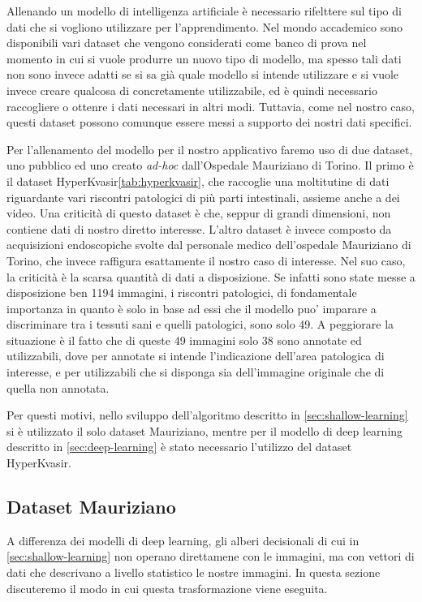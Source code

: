 Allenando un modello di intelligenza artificiale è necessario
rifelttere sul tipo di dati che si vogliono utilizzare per
l'apprendimento.
Nel mondo accademico sono disponibili vari dataset che vengono
considerati come banco di prova nel momento in cui si vuole
produrre un nuovo tipo di modello, ma spesso tali dati non 
sono invece adatti se si sa già quale modello si intende
utilizzare e si vuole invece creare qualcosa di concretamente
utilizzabile, ed è quindi necessario raccogliere o ottenre
i dati necessari in altri modi.
Tuttavia, come nel nostro caso, questi dataset possono comunque
essere messi a supporto dei nostri dati specifici.

Per l'allenamento del modello per il nostro applicativo faremo
uso di due dataset, uno pubblico ed uno creato {\it ad-hoc}
dall'Ospedale Mauriziano di Torino.
Il primo è il dataset HyperKvasir\ref{tab:hyperkvasir},
che raccoglie una moltitutine di dati riguardante
vari riscontri patologici di più parti intestinali, assieme
anche a dei video.
Una criticità di questo dataset è che, seppur di grandi dimensioni,
non contiene dati di nostro diretto interesse.
L'altro dataset è invece composto da acquisizioni endoscopiche
svolte dal personale medico dell'ospedale Mauriziano di Torino,
che invece raffigura esattamente il nostro caso di interesse.
Nel suo caso, la criticità è la scarsa quantità di dati
a disposizione.
Se infatti sono state messe a disposizione ben 1194 immagini,
i riscontri patologici, di fondamentale importanza in quanto
è solo in base ad essi che il modello puo' imparare a discriminare
tra i tessuti sani e quelli patologici, sono solo 49.
A peggiorare la situazione è il fatto che di queste 49 immagini
solo 38 sono annotate ed utilizzabili, dove per annotate
si intende l'indicazione dell'area patologica di interesse, e per
utilizzabili che si disponga sia dell'immagine originale che di
quella non annotata.

Per questi motivi, nello sviluppo dell'algoritmo descritto in
\ref{sec:shallow-learning} si è utilizzato il solo dataset
Mauriziano, mentre per il modello di deep learning
descritto in \ref{sec:deep-learning} è stato necessario
l'utilizzo del dataset HyperKvasir.

\subsection{\label{sec:mauriziano}Dataset Mauriziano}

A differenza dei modelli di deep learning, gli alberi decisionali
di cui in \ref{sec:shallow-learning} non operano direttamene
con le immagini, ma con vettori di dati che descrivano a livello
statistico le nostre immagini.
In questa sezione discuteremo il modo in cui questa trasformazione
viene eseguita.


